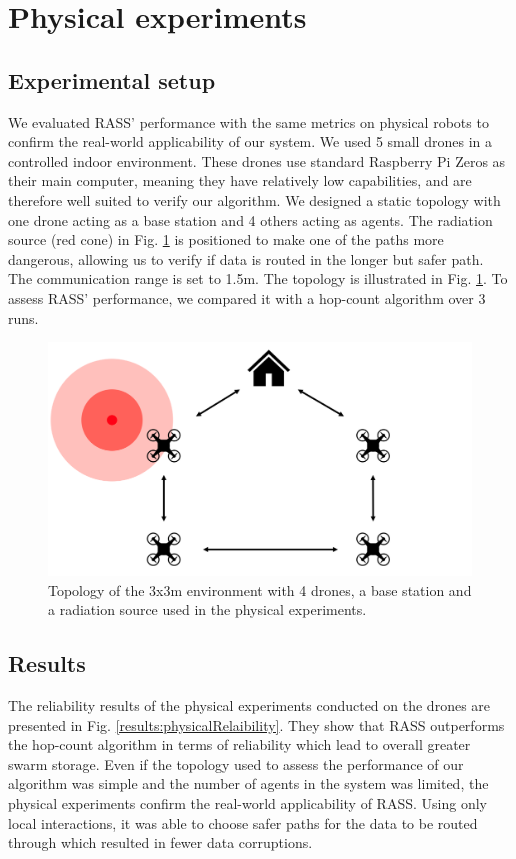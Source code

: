 \documentclass[runningheads]{llncs}
\begin{document}
\section{Physical experiments}
\label{Physical experiments}

\subsection{Experimental setup}
We evaluated RASS' performance with the same
metrics on physical robots to confirm the real-world applicability of our system. We used 5 small drones in a controlled indoor environment. These drones use standard Raspberry Pi Zeros as their main computer, meaning they have relatively low capabilities, and are therefore well suited to verify our algorithm. We designed a static topology with one drone acting as a base station and 4 others acting as agents. The radiation source (red cone) in Fig. \ref{cogniflyExperiment} is positioned to make one of the paths more dangerous, allowing us to verify if data is routed in the longer but safer path. The communication range is set to 1.5m. The topology is illustrated in Fig. \ref{cogniflyExperiment}. To assess RASS' performance, we compared it with a hop-count algorithm over 3 runs.

\begin{figure}[h]
	\centering
    \includegraphics[width=0.80\columnwidth]{figures/physical-topology.png}
    \caption{Topology of the 3x3m environment with 4 drones, a base station and a radiation source used in the physical experiments.}
    \label{cogniflyExperiment}
\vspace{-2mm}
\end{figure}

\subsection{Results}
The reliability results of the physical experiments conducted on the drones are presented in Fig. \ref{results:physicalRelaibility}. They show that RASS outperforms the hop-count algorithm in terms of reliability which lead to overall greater swarm storage. Even if the topology used to assess the performance of our algorithm was simple and the number of agents in the system was limited, the physical experiments confirm the real-world applicability of RASS. Using only local interactions, it was able to choose safer paths for the data to be routed through which resulted in fewer data corruptions.
\end{document}

